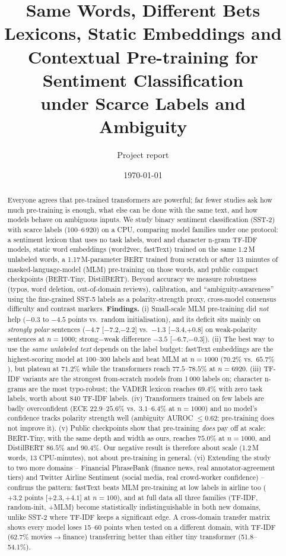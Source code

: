 \documentclass[11pt,a4paper]{article}
\title{\textbf{Same Words, Different Bets}\\[2pt]
\large Lexicons, Static Embeddings and Contextual Pre-training for Sentiment Classification\\ under Scarce Labels and Ambiguity}
\author{Project report}
\date{\today}
\begin{document}
\maketitle

\begin{abstract}
Everyone agrees that pre-trained transformers are powerful; far fewer studies ask how much pre-training is enough, what else can be done with the same text, and how models behave on ambiguous inputs.
We study binary sentiment classification (SST-2) with scarce labels (100--6\,920) on a CPU, comparing model families under one protocol: a sentiment lexicon that uses no task labels, word and character n-gram TF-IDF models,
static word embeddings (word2vec, fastText) trained on the same 1.2\,M unlabeled words, a 1.17\,M-parameter BERT trained from scratch or after 13 minutes of masked-language-model (MLM) pre-training on those words, and public compact checkpoints (BERT-Tiny, DistilBERT).
Beyond accuracy we measure robustness (typos, word deletion, out-of-domain reviews), calibration, and ``ambiguity-awareness'' using the fine-grained SST-5 labels as a polarity-strength proxy, cross-model consensus difficulty and contrast markers.
\textbf{Findings.} (i) Small-scale MLM pre-training did \emph{not} help ($-0.3$ to $-4.5$ points vs.\ random initialisation), and its deficit sits mainly on \emph{strongly polar} sentences ($-4.7$ [$-7.2$,$-2.2$] vs.\ $-1.3$ [$-3.4$,$+0.8$] on weak-polarity sentences at $n{=}1000$; strong$-$weak difference $-3.5$ [$-6.7$,$-0.3$]).
(ii) The best way to use the \emph{same unlabeled text} depends on the label budget: fastText embeddings are the highest-scoring model at 100--300 labels and beat MLM at $n{=}1000$ ($70.2\%$ vs.\ $65.7\%$), but plateau at $71.2\%$ while the transformers reach $77.5$--$78.5\%$ at $n{=}6920$.
(iii) TF-IDF variants are the strongest from-scratch models from 1\,000 labels on; character n-grams are the most typo-robust; the VADER lexicon reaches $69.4\%$ with zero task labels, worth about 840 TF-IDF labels.
(iv) Transformers trained on few labels are badly overconfident (ECE $22.9$--$25.6\%$ vs.\ $3.1$--$6.4\%$ at $n{=}1000$) and no model's confidence tracks polarity strength well (ambiguity AUROC $\le0.62$; pre-training does not improve it).
(v) Public checkpoints show that pre-training \emph{does} pay off at scale: BERT-Tiny, with the same depth and width as ours, reaches $75.0\%$ at $n{=}1000$, and DistilBERT $86.5\%$ and $90.4\%$.
Our negative result is therefore about scale (1.2\,M words, 13 CPU-minutes), not about pre-training in general.
(vi) Extending the study to two more domains -- Financial PhraseBank (finance news, real annotator-agreement tiers) and Twitter Airline Sentiment (social media, real crowd-worker confidence) -- confirms the pattern: fastText beats MLM pre-training at low labels in airline too ($+3.2$ points [$+2.3,+4.1$] at $n{=}100$), and at full data all three families (TF-IDF, random-init, +MLM) become statistically indistinguishable in both new domains, unlike SST-2 where TF-IDF keeps a significant edge. A cross-domain transfer matrix shows every model loses 15--60 points when tested on a different domain, with TF-IDF (62.7\% movies$\to$finance) transferring better than either tiny transformer (51.8--54.1\%).
\end{abstract}
\end{document}
